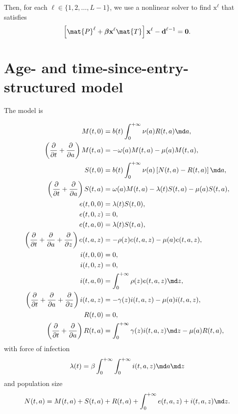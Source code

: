 \documentclass{jpmarticle}
\renewcommand{\vec}[1]{\boldsymbol{\mathrm{#1}}}
\let\subequationsorig\subequations%
\let\endsubequationsorig\endsubequations%
\renewenvironment{subequations}{
  \subequationsorig
  \renewcommand{\theequation}{\theparentequation.\arabic{equation}}
}{
  \endsubequationsorig
}
\begin{document}
Then, for each $\ell \in \{1, 2, \ldots, L - 1\}$,
we use a nonlinear solver to find $\vec{x}^{\ell}$ that satisfies
\begin{equation}
  \left[
    \mat{P}^{\ell}
    + \vec{\beta} \vec{x}^{\ell} \mat{T}
  \right] \vec{x}^{\ell}
  - \vec{d}^{\ell - 1}
  = \vec{0}.
\end{equation}


\section{Age- and time-since-entry-structured model}

The model is
\begin{subequations}
  \label{model_age_and_time_since_entry_structured}
  \begin{align}
    M(t, 0) &=
    b(t) \int_0^{+\infty} \nu(a) R(t, a) \md a,
    \\
    \left(\frac{\partial}{\partial t}
      + \frac{\partial}{\partial a}\right)
    M(t, a) &=
    - \omega(a) M(t, a) - \mu(a) M(t, a),
    \\
    S(t, 0) &=
    b(t) \int_0^{+\infty} \nu(a) \left[N(t, a) - R(t, a)\right] \md a,
    \\
    \left(\frac{\partial}{\partial t}
      + \frac{\partial}{\partial a}\right)
    S(t, a) &=
    \omega(a) M(t, a) - \lambda(t) S(t, a) - \mu(a) S(t, a),
    \\
    e(t, 0, 0) &=
    \lambda(t) S(t, 0),
    \\
    e(t, 0, z) &=
    0,
    \\
    e(t, a, 0) &=
    \lambda(t) S(t, a),
    \\
    \left(\frac{\partial}{\partial t}
      + \frac{\partial}{\partial a}
      + \frac{\partial}{\partial z}\right)
    e(t, a, z) &=
    - \rho(z) e(t, a, z) - \mu(a) e(t, a, z),
    \\
    i(t, 0, 0) &=
    0,
    \\
    i(t, 0, z) &=
    0,
    \\
    i(t, a, 0) &=
    \int_0^{+\infty} \rho(z) e(t, a, z) \md z,
    \\
    \left(\frac{\partial}{\partial t}
      + \frac{\partial}{\partial a}
      + \frac{\partial}{\partial z}\right)
    i(t, a, z) &=
    - \gamma(z) i(t, a, z) - \mu(a) i(t, a, z),
    \\
    R(t, 0) &=
    0,
    \\
    \left(\frac{\partial}{\partial t}
      + \frac{\partial}{\partial a}\right)
    R(t, a) &=
    \int_0^{+\infty} \gamma(z) i(t, a, z) \md z
    - \mu(a) R(t, a),
  \end{align}
  with force of infection
  \begin{equation}
    \lambda(t) =
    \beta
    \int_0^{+\infty} \int_0^{+\infty}
    i(t, a, z)
    \md a \md z
  \end{equation}
  and population size
  \begin{equation}
    N(t, a) =
    M(t, a) + S(t, a) + R(t, a)
    + \int_0^{+\infty} e(t, a, z) + i(t, a, z) \md z.
  \end{equation}
\end{subequations}
\end{document}

